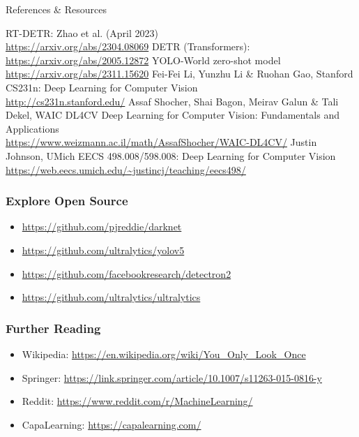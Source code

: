 \begin{frame}[allowframebreaks]{References \& Resources}
\begin{thebibliography}{99}
            RT-DETR: Zhao et al. (April 2023) \\
            \url{https://arxiv.org/abs/2304.08069}
            DETR (Transformers): \url{https://arxiv.org/abs/2005.12872}
            YOLO-World zero-shot model \\
            \url{https://arxiv.org/abs/2311.15620}
            Fei-Fei Li, Yunzhu Li \& Ruohan Gao, Stanford CS231n: Deep Learning for Computer Vision \\
            \url{http://cs231n.stanford.edu/}
            Assaf Shocher, Shai Bagon, Meirav Galun \& Tali Dekel, WAIC DL4CV Deep Learning for Computer Vision: Fundamentals and Applications \\
            \url{https://www.weizmann.ac.il/math/AssafShocher/WAIC-DL4CV/}
            Justin Johnson, UMich EECS 498.008/598.008: Deep Learning for Computer Vision \\
            \url{https://web.eecs.umich.edu/~justincj/teaching/eecs498/}
    \end{thebibliography}
    \frametitle{Explore Open Source}
    \begin{itemize}
        \item \url{https://github.com/pjreddie/darknet}
        \item \url{https://github.com/ultralytics/yolov5}
        \item \url{https://github.com/facebookresearch/detectron2}
        \item \url{https://github.com/ultralytics/ultralytics}
    \end{itemize}
    \frametitle{Further Reading}
    \begin{itemize}
        \item Wikipedia: \url{https://en.wikipedia.org/wiki/You_Only_Look_Once}
        \item Springer: \url{https://link.springer.com/article/10.1007/s11263-015-0816-y}
        \item Reddit: \url{https://www.reddit.com/r/MachineLearning/}
        \item CapaLearning: \url{https://capalearning.com/}
    \end{itemize}
\end{frame}